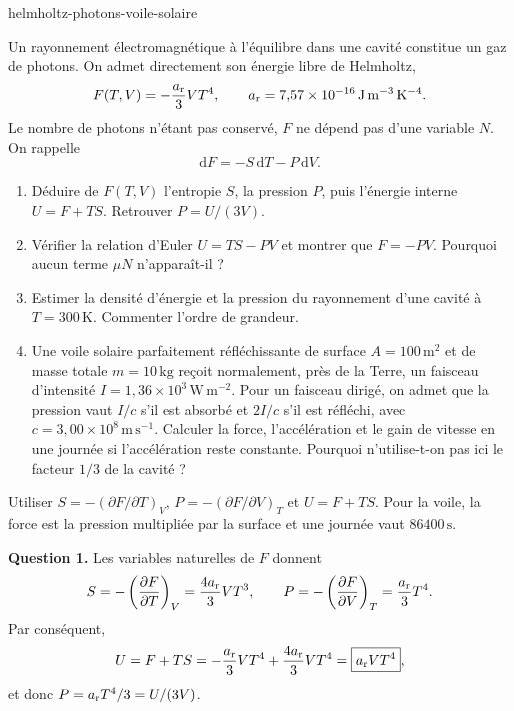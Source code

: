 \begin{exo}{helmholtz-photons-voile-solaire}

Un rayonnement électromagnétique à l'équilibre dans une cavité constitue un gaz de photons. On admet directement son énergie libre de Helmholtz,
\[
F(T,V)=-\frac{a_{\rm r}}{3}VT^4,
\qquad
a_{\rm r}=7{,}57\times10^{-16}\,\mathrm{J\,m^{-3}\,K^{-4}}.
\]
Le nombre de photons n'étant pas conservé, $F$ ne dépend pas d'une variable $N$. On rappelle
\[
\mathrm dF=-S\,\mathrm dT-P\,\mathrm dV.
\]

\begin{enumerate}
\item Déduire de $F(T,V)$ l'entropie $S$, la pression $P$, puis l'énergie interne $U=F+TS$. Retrouver $P=U/(3V)$.
\item Vérifier la relation d'Euler $U=TS-PV$ et montrer que $F=-PV$. Pourquoi aucun terme $\mu N$ n'apparaît-il ?
\item Estimer la densité d'énergie et la pression du rayonnement d'une cavité à $T=300\,\mathrm K$. Commenter l'ordre de grandeur.
\item Une voile solaire parfaitement réfléchissante de surface $A=100\,\mathrm{m^2}$ et de masse totale $m=10\,\mathrm{kg}$ reçoit normalement, près de la Terre, un faisceau d'intensité $I=1{,}36\times10^3\,\mathrm{W\,m^{-2}}$. Pour un faisceau dirigé, on admet que la pression vaut $I/c$ s'il est absorbé et $2I/c$ s'il est réfléchi, avec $c=3{,}00\times10^8\,\mathrm{m\,s^{-1}}$. Calculer la force, l'accélération et le gain de vitesse en une journée si l'accélération reste constante. Pourquoi n'utilise-t-on pas ici le facteur $1/3$ de la cavité ?
\end{enumerate}

\begin{indication}
Utiliser $S=-(\partial F/\partial T)_V$, $P=-(\partial F/\partial V)_T$ et $U=F+TS$. Pour la voile, la force est la pression multipliée par la surface et une journée vaut $86400\,\mathrm s$.
\end{indication}

\begin{solution}
\textbf{Question 1.} Les variables naturelles de $F$ donnent
\[
S=-\left(\frac{\partial F}{\partial T}\right)_V
=\frac{4a_{\rm r}}{3}VT^3,
\qquad
P=-\left(\frac{\partial F}{\partial V}\right)_T
=\frac{a_{\rm r}}{3}T^4.
\]
Par conséquent,
\[
U=F+TS=-\frac{a_{\rm r}}{3}VT^4
+\frac{4a_{\rm r}}{3}VT^4
=\boxed{a_{\rm r}VT^4},
\]
et donc $P=a_{\rm r}T^4/3=U/(3V)$.


\end{solution}
\end{exo}
